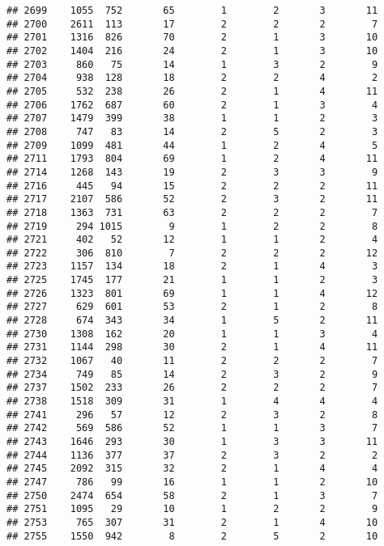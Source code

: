 \documentclass[]{article}
\begin{document}
\begin{verbatim}
## 2699    1055  752       65        1        2       3       11
## 2700    2611  113       17        2        2       2        7
## 2701    1316  826       70        2        1       3       10
## 2702    1404  216       24        2        1       3       10
## 2703     860   75       14        1        3       2        9
## 2704     938  128       18        2        2       4        2
## 2705     532  238       26        2        1       4       11
## 2706    1762  687       60        2        1       3        4
## 2707    1479  399       38        1        1       2        3
## 2708     747   83       14        2        5       2        3
## 2709    1099  481       44        1        2       4        5
## 2711    1793  804       69        1        2       4       11
## 2714    1268  143       19        2        3       3        9
## 2716     445   94       15        2        2       2       11
## 2717    2107  586       52        2        3       2       11
## 2718    1363  731       63        2        2       2        7
## 2719     294 1015        9        1        2       2        8
## 2721     402   52       12        1        1       2        4
## 2722     306  810        7        2        2       2       12
## 2723    1157  134       18        2        1       4        3
## 2725    1745  177       21        1        1       2        3
## 2726    1323  801       69        1        1       4       12
## 2727     629  601       53        2        1       2        8
## 2728     674  343       34        1        5       2       11
## 2730    1308  162       20        1        1       3        4
## 2731    1144  298       30        2        1       4       11
## 2732    1067   40       11        2        2       2        7
## 2734     749   85       14        2        3       2        9
## 2737    1502  233       26        2        2       2        7
## 2738    1518  309       31        1        4       4        4
## 2741     296   57       12        2        3       2        8
## 2742     569  586       52        1        1       3        7
## 2743    1646  293       30        1        3       3       11
## 2744    1136  377       37        2        3       2        2
## 2745    2092  315       32        2        1       4        4
## 2747     786   99       16        1        1       2       10
## 2750    2474  654       58        2        1       3        7
## 2751    1095   29       10        1        2       2        9
## 2753     765  307       31        2        1       4       10
## 2755    1550  942        8        2        5       2       10

\end{verbatim}
\end{document}
